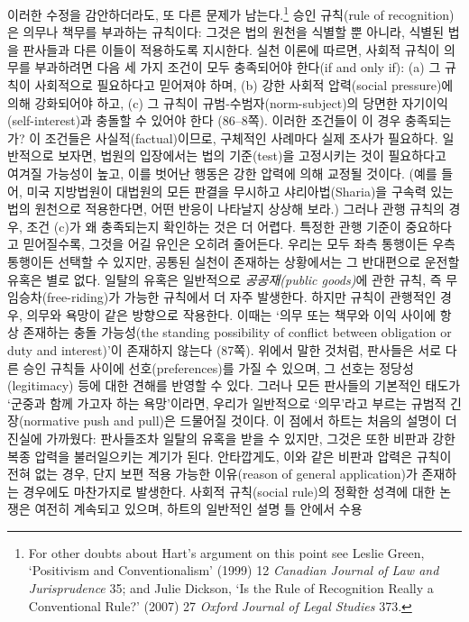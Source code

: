 \documentclass[12pt, oneside]{book}  %
\begin{document}
이러한 수정을 감안하더라도, 또 다른 문제가 남는다.\footnote{For other
  doubts about Hart's argument on this point see Leslie Green,
  `Positivism and Conventionalism' (1999) 12 \emph{Canadian Journal of
  Law and Jurisprudence} 35; and Julie Dickson, `Is the Rule of
  Recognition Really a Conventional Rule?' (2007) 27 \emph{Oxford
  Journal of Legal Studies} 373.} 승인 규칙(rule of recognition)은
의무나 책무를 부과하는 규칙이다: 그것은 법의 원천을 식별할 뿐 아니라,
식별된 법을 판사들과 다른 이들이 적용하도록 지시한다. 실천 이론에
따르면, 사회적 규칙이 의무를 부과하려면 다음 세 가지 조건이 모두
충족되어야 한다(if and only if): (a) 그 규칙이 사회적으로 필요하다고
믿어져야 하며, (b) 강한 사회적 압력(social pressure)에 의해 강화되어야
하고, (c) 그 규칙이 규범-수범자(norm-subject)의 당면한
자기이익(self-interest)과 충돌할 수 있어야 한다 (86--8쪽). 이러한
조건들이 이 경우 충족되는가? 이 조건들은 사실적(factual)이므로, 구체적인
사례마다 실제 조사가 필요하다. 일반적으로 보자면, 법원의 입장에서는 법의
기준(test)을 고정시키는 것이 필요하다고 여겨질 가능성이 높고, 이를
벗어난 행동은 강한 압력에 의해 교정될 것이다. (예를 들어, 미국
지방법원이 대법원의 모든 판결을 무시하고 샤리아법(Sharia)을 구속력 있는
법의 원천으로 적용한다면, 어떤 반응이 나타날지 상상해 보라.) 그러나 관행
규칙의 경우, 조건 (c)가 왜 충족되는지 확인하는 것은 더 어렵다. 특정한
관행 기준이 중요하다고 믿어질수록, 그것을 어길 유인은 오히려 줄어든다.
우리는 모두 좌측 통행이든 우측 통행이든 선택할 수 있지만, 공통된 실천이
존재하는 상황에서는 그 반대편으로 운전할 유혹은 별로 없다. 일탈의 유혹은
일반적으로 \emph{공공재(public goods)}에 관한 규칙, 즉
무임승차(free-riding)가 가능한 규칙에서 더 자주 발생한다. 하지만 규칙이
관행적인 경우, 의무와 욕망이 같은 방향으로 작용한다. 이때는 `의무 또는
책무와 이익 사이에 항상 존재하는 충돌 가능성(the standing possibility of
conflict between obligation or duty and interest)'이 존재하지 않는다
(87쪽). 위에서 말한 것처럼, 판사들은 서로 다른 승인 규칙들 사이에
선호(preferences)를 가질 수 있으며, 그 선호는 정당성(legitimacy) 등에
대한 견해를 반영할 수 있다. 그러나 모든 판사들의 기본적인 태도가 `군중과
함께 가고자 하는 욕망'이라면, 우리가 일반적으로 `의무'라고 부르는 규범적
긴장(normative push and pull)은 드물어질 것이다. 이 점에서 하트는 처음의
설명이 더 진실에 가까웠다: 판사들조차 일탈의 유혹을 받을 수 있지만,
그것은 또한 비판과 강한 복종 압력을 불러일으키는 계기가 된다.
안타깝게도, 이와 같은 비판과 압력은 규칙이 전혀 없는 경우, 단지 보편
적용 가능한 이유(reason of general application)가 존재하는 경우에도
마찬가지로 발생한다. 사회적 규칙(social rule)의 정확한 성격에 대한
논쟁은 여전히 계속되고 있으며, 하트의 일반적인 설명 틀 안에서 수용
\end{document}
